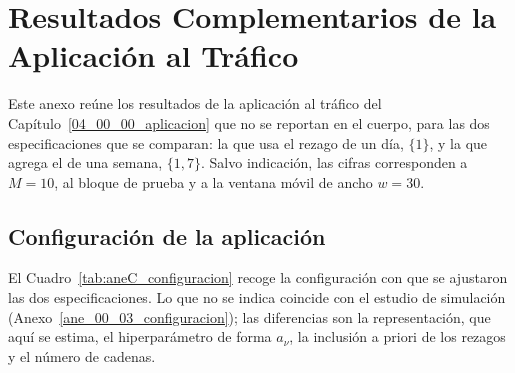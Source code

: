 \chapter{Resultados Complementarios de la Aplicación al Tráfico}
\label{aneC_00_00_trafico}


Este anexo reúne los resultados de la aplicación al tráfico del Capítulo~\ref{04_00_00_aplicacion} que no se reportan en el cuerpo, para las dos especificaciones que se comparan: la que usa el rezago de un día, $\{1\}$, y la que agrega el de una semana, $\{1,7\}$. Salvo indicación, las cifras corresponden a $M = 10$, al bloque de prueba y a la ventana móvil de ancho $w = 30$.

\section{Configuración de la aplicación}
\label{aneC_00_01_configuracion}

El Cuadro~\ref{tab:aneC_configuracion} recoge la configuración con que se ajustaron las dos especificaciones. Lo que no se indica coincide con el estudio de simulación (Anexo~\ref{ane_00_03_configuracion}); las diferencias son la representación, que aquí se estima, el hiperparámetro de forma $a_\nu$, la inclusión a priori de los rezagos y el número de cadenas.

